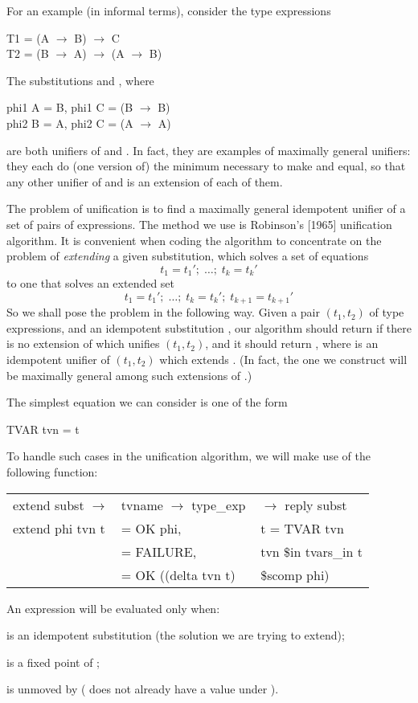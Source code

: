 For an example (in informal terms), consider the type expressions
\begin{mlcoded}
    T1 = (A $\rightarrow$ B) $\rightarrow$ C\\
    T2 = (B $\rightarrow$ A) $\rightarrow$ (A $\rightarrow$ B)
\end{mlcoded}
The substitutions  and , where
\begin{mlcoded}
    phi1 A = B, phi1 C = (B $\rightarrow$ B)\\
    phi2 B = A, phi2 C = (A $\rightarrow$ A)
\end{mlcoded}
are both unifiers of  and . In fact, they are examples of maximally general
unifiers: they each do (one version of) the minimum necessary to make  and
 equal, so that any other unifier of  and  is an extension of each of them.

The problem of unification is to find a maximally general idempotent unifier
of a set of pairs of expressions. The method we use is Robinson's [1965]
unification algorithm. It is convenient when coding the algorithm to concentrate
on the problem of \textit{extending} a given substitution, which solves a set of
equations
\[
t_1 = t_1';\; \ldots ;\; t_k = t_k'
\]
to one that solves an extended set
\[
t_1 = t_1';\; \ldots;\; t_k = t_k';\; t_{k+1} = t_{k+1}'
\]
So we shall pose the problem in the following way. Given a pair $(t_1, t_2)$ of type
expressions, and an idempotent substitution , our algorithm should return
 if there is no extension of  which unifies $(t_1, t_2)$, and it should return
, where  is an idempotent unifier of $(t_1, t_2)$ which extends . (In
fact, the one we construct will be maximally general among such extensions of
.)

The simplest equation we can consider is one of the form
\begin{mlcoded}
TVAR tvn = t
\end{mlcoded}
To handle such cases in the unification algorithm, we will make use of the
following function:
\begin{mlcoded}
\begin{tabular}{lll}
extend \hastype{} subst $\rightarrow$ &tvname $\rightarrow$ type\_exp{}\,& $\rightarrow$ reply subst \\
extend phi tvn t &= OK phi, & t = TVAR tvn \\
&= FAILURE, &tvn \$in tvars\_in t \\
&= OK ((delta tvn t) &\$scomp phi)
\end{tabular}
\end{mlcoded}
An expression  will be evaluated only when:
\begin{numbered}
    \item {} is an idempotent substitution (the solution we are trying to extend);
    \item {} is a fixed point of ;
    \item {} is unmoved by  ( does not already have a value under ).
\end{numbered}

